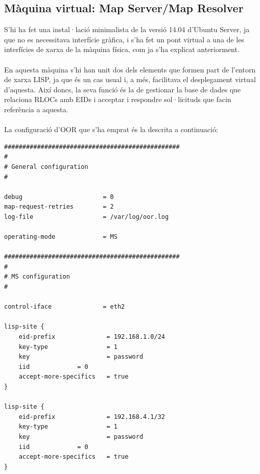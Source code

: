 \documentclass[11pt]{article}
\begin{document}
\subsection{Màquina virtual: Map Server/Map Resolver}
S’hi ha fet una instal·lació minimalista de la versió 14.04 d’Ubuntu Server, ja que no es necessitava interfície gràfica, i s’ha fet un pont virtual a una de les interfícies de xarxa de la màquina física, com ja s’ha explicat anteriorment.\\
\\
En aquesta màquina s’hi han unit dos dels elements que formen part de l’entorn de xarxa LISP, ja que és un cas usual i, a més, facilitava el desplegament virtual d’aquesta. Així doncs, la seva funció és la de gestionar la base de dades que relaciona RLOCs amb EIDs i acceptar i respondre sol·licituds que facin referència a aquesta.\\
\\
La configuració d’OOR que s’ha emprat és la descrita a continuació:\\
\lstset{caption=Configuració d'OOR del Map Server/Map Resolver}
\begin{lstlisting}[frame=single]
################################################
#
# General configuration
#

debug                      = 0 
map-request-retries        = 2
log-file                   = /var/log/oor.log
 
operating-mode             = MS

################################################
#
# MS configuration
#

control-iface              = eth2

lisp-site {
    eid-prefix            	= 192.168.1.0/24
    key-type              	= 1
    key                   	= password
    iid				= 0
    accept-more-specifics	= true
}

lisp-site {
    eid-prefix            	= 192.168.4.1/32
    key-type              	= 1
    key                   	= password
    iid				= 0
    accept-more-specifics	= true
}
\end{lstlisting}
\end{document}
